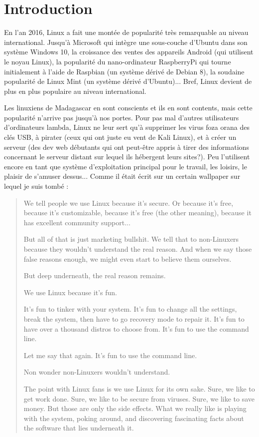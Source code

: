 \chapter*{Introduction}

En l'an 2016, Linux a fait une montée de popularité très remarquable au niveau
international. Jusqu'à Microsoft qui intègre une sous-couche d'Ubuntu dans son
système Windows 10, la croissance des ventes des appareils Android (qui utilisent
le noyau Linux), la popularité du nano-ordinateur RaspberryPi qui tourne
initialement à l'aide de Raspbian (un système dérivé de Debian 8), la soudaine
popularité de Linux Mint (un système dérivé d'Ubuntu)... Bref, Linux devient de
plus en plus populaire au niveau international.

Les linuxiens de Madagascar en sont conscients et ils en sont contents, mais
cette popularité n'arrive pas jusqu'à nos portes. Pour pas mal d'autres
utilisateurs d'ordinateurs lambda, Linux ne leur sert qu'à supprimer les virus
foza orana des clés USB, à pirater (ceux qui ont juste eu vent de Kali Linux),
et à créer un serveur (des dev web débutants qui ont peut-être appris à tirer
des informations concernant le serveur distant sur lequel ils hébergent leurs
sites?). Peu l'utilisent encore en tant que système d'exploitation principal pour
le travail, les loisirs, le plaisir de s'amuser dessus... Comme il était écrit
sur un certain wallpaper sur lequel je suis tombé :

\begin{quotation}
  We tell people we use Linux because it's secure. Or because it's free, because
  it's customizable, because it's free (the other meaning), because it has
  excellent community support...

  But all of that is just marketing bullshit. We tell that to non-Linuxers because
  they wouldn't understand the real reason. And when we say those false reasons
  enough, we might even start to believe them ourselves.

  But deep underneath, the real reason remains.

  We use Linux because it's fun.

  It's fun to tinker with your system. It's fun to change all the settings,
  break the system, then have to go recovery mode to repair it. It's fun to have
  over a thousand distros to choose from. It's fun to use the command line.

  Let me say that again. It's fun to use the command line.

  Non wonder non-Linuxers wouldn't understand.

  The point with Linux fans is we use Linux for its own sake. Sure, we like to
  get work done. Sure, we like to be secure from viruses. Sure, we like to save
  money. But those are only the side effects. What we really like is playing
  with the system, poking around, and discovering fascinating facts about the
  software that lies underneath it.
\end{quotation}

